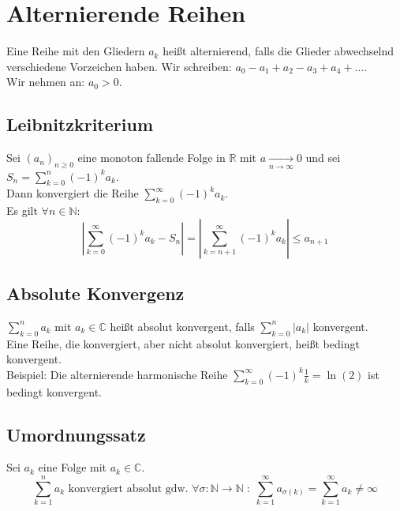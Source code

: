 \documentclass[halfparscip]{scrartcl}
\newcounter{subsection2}
\begin{document}
\pagebreak
\setcounter{subsection2}{\value{subsection}}
\section*{Alternierende Reihen}
\setcounter{subsection}{\value{subsection2}}
Eine Reihe mit den Gliedern $a_k$ heißt alternierend, falls die Glieder abwechselnd verschiedene Vorzeichen haben. Wir schreiben: $a_0 - a_1 + a_2 - a_3 + a_4 + ...$.\\
Wir nehmen an: $a_0 > 0$.

\subsection{Leibnitzkriterium}
Sei $(a_n)_{n\geq0}$ eine monoton fallende Folge in $\mathbb{R}$ mit $a \xrightarrow[n \rightarrow \infty]{} 0$ und sei $S_n = \sum\limits_{k=0}^n(-1)^ka_k$.\\
Dann konvergiert die Reihe $\sum\limits_{k=0}^\infty(-1)^ka_k$.\\
Es gilt $\forall n \in \mathbb{N}$:
\begin{equation*}
	\left\vert \sum_{k=0}^{\infty}(-1)^ka_k-S_n\right\vert = \left\vert \sum_{k=n+1}^{\infty}(-1)^ka_k\right\vert \leq a_{n+1}
\end{equation*}

\subsection{Absolute Konvergenz}
$\sum\limits_{k=0}^na_k$ mit $a_k \in \mathbb{C}$ heißt absolut konvergent, falls $\sum\limits_{k=0}^n\vert a_k\vert$ konvergent.\\
Eine Reihe, die konvergiert, aber nicht absolut konvergiert, heißt bedingt konvergent.\\
Beispiel: Die alternierende harmonische Reihe $\sum\limits_{k=0}^\infty(-1)^k\frac{1}{k} = \ln(2)$ ist bedingt konvergent.

\subsection{Umordnungssatz}
Sei $a_k$ eine Folge mit $a_k \in \mathbb{C}$.
\begin{equation*}
	\sum_{k=1}^na_k \text{ konvergiert absolut gdw. } \forall\sigma: \mathbb{N} \rightarrow \mathbb{N} \;:\; \sum_{k=1}^\infty a_{\sigma(k)} = \sum_{k=1}^\infty a_k \neq \infty
\end{equation*}
\end{document}
